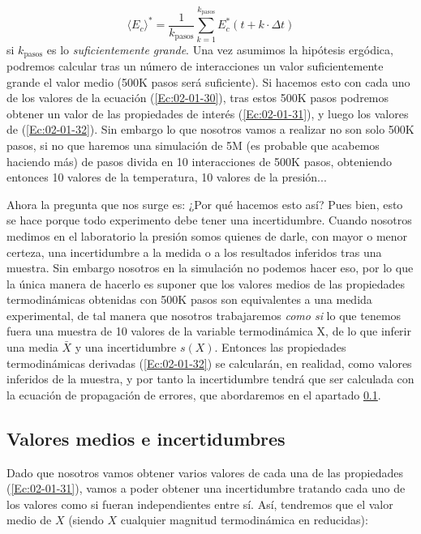 \documentclass[11pt]{article} %
\newcommand{\Ec}{\langle E_c \rangle}
\begin{document}
\begin{equation*}
	\Ec^* = \frac{1}{k_{\text{pasos}}} \sum_{k=1}^{k_{\text{pasos}}} E_c^*(t+k\cdot\Delta t)
\end{equation*}
si $k_{\text{pasos}}$ es lo \textit{suficientemente grande}. Una vez asumimos la hipótesis ergódica, podremos calcular tras un número de interacciones un valor suficientemente grande el valor medio (500K pasos será suficiente). Si hacemos esto con cada uno de los valores de la ecuación (\ref{Ec:02-01-30}), tras estos 500K pasos podremos obtener un valor de las propiedades de interés (\ref{Ec:02-01-31}), y luego los valores de (\ref{Ec:02-01-32}). Sin embargo lo que nosotros vamos a realizar no son solo 500K pasos, si no que haremos una simulación de 5M (es probable que acabemos haciendo más) de pasos divida en 10 interacciones de 500K pasos, obteniendo entonces 10 valores de la temperatura, 10 valores de la presión... 

Ahora la pregunta que nos surge es: ¿Por qué hacemos esto así? Pues bien, esto se hace porque todo experimento debe tener una incertidumbre. Cuando nosotros medimos en el laboratorio la presión somos quienes de darle, con mayor o menor certeza, una incertidumbre a la medida o a los resultados inferidos tras una muestra. Sin embargo nosotros en la simulación no podemos hacer eso, por lo que la única manera de hacerlo es suponer que los valores medios de las propiedades termodinámicas obtenidas con 500K pasos son equivalentes a una medida experimental, de tal manera que nosotros trabajaremos \textit{como si} lo que tenemos fuera una muestra de 10 valores de la variable termodinámica X, de lo que inferir una media $\bar{X}$ y una incertidumbre $s(X)$. Entonces las propiedades termodinámicas derivadas (\ref{Ec:02-01-32}) se calcularán, en realidad, como valores inferidos de la muestra, y por tanto la incertidumbre tendrá que ser calculada con la ecuación de propagación de errores, que abordaremos en el apartado \ref{Subsec:03-01}.



\subsection{Valores medios e incertidumbres} \label{Subsec:03-01}


Dado que nosotros vamos obtener varios valores de cada una de las propiedades (\ref{Ec:02-01-31}), vamos a poder obtener una incertidumbre tratando cada uno de los valores como si fueran independientes entre sí. Así, tendremos que el valor medio de $X$ (siendo $X$ cualquier magnitud termodinámica en reducidas):
\end{document}
